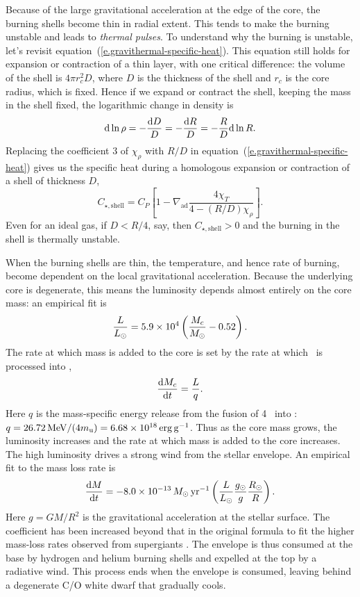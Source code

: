 Because of the large gravitational acceleration at the edge of the core, the burning shells become thin in radial extent.  This tends to make the burning unstable and leads to \emph{thermal pulses}.
To understand why the burning is unstable, let's revisit equation~(\ref{e.gravithermal-specific-heat}).  This equation still holds for expansion or contraction of a thin layer, with one critical difference: the volume of the shell is $4\pi r_{c}^{2}D$, where $D$ is the thickness of the shell and $r_{c}$ is the core radius, which is fixed. Hence if we expand or contract the shell, keeping the mass in the shell fixed, the logarithmic change in density is
\[ \mathrm{d}\ln\rho = -\frac{\mathrm{d} D}{D} = -\frac{\mathrm{d} R}{D} = -\frac{R}{D}\mathrm{d}\ln R. \]
Replacing the coefficient 3 of $\chi_{\rho}$ with $R/D$ in equation~(\ref{e.gravithermal-specific-heat}) gives us the specific heat during a homologous expansion or contraction of a shell of thickness $D$,
\begin{equation}\label{e.thin-shell-specific-heat}
 C_{\star,\mathrm{shell}} = C_{P}\left[1-\nabla_{\mathrm{ad}}\frac{4\chi_{T}}{4-(R/D)\chi_{\rho}}\right].
\end{equation}
Even for an ideal gas, if $D < R/4$, say, then $C_{\star,\mathrm{shell}} > 0$ and the burning in the shell is thermally unstable.

When the burning shells are thin, the temperature, and hence rate of burning, become dependent on the local gravitational acceleration.  Because the underlying core is degenerate, this means the luminosity depends almost entirely on the core mass: an empirical fit is \citep{Paczynski1970Evolution-of-Si}
\begin{equation}\label{e.paczynski}
\frac{L}{L_{\odot}} = 5.9\times 10^{4}\left(\frac{M_{c}}{M_\odot}-0.52\right).
\end{equation}
The rate at which mass is added to the core is set by the rate at which \hydrogen\ is processed into \helium,
\begin{equation}\label{e.mdot-core}
\frac{\mathrm{d} M_{c}}{\mathrm{d} t} = \frac{L}{q}.
\end{equation}
Here $q$ is the mass-specific energy release from the fusion of 4 \hydrogen\ into \helium: $q = 26.72\,\mathrm{M}\mathrm{eV}/(4m_\mathrm{u}) = 6.68\times 10^{18}\,\mathrm{erg}\,{\mathrm{g}}^{-1}$.  Thus as the core mass grows, the luminosity increases and the rate at which mass is added to the core increases.  The high luminosity drives a strong wind from the stellar envelope.  An empirical fit to the mass loss rate is \citep{Reimers1977On-the-absolute}
\begin{equation}\label{e.wind-loss}
\frac{\mathrm{d} M}{\mathrm{d} t} = - 8.0\times 10^{-13}\,M_\odot\,\mathrm{yr}^{-1} \left(\frac{L}{L_{\odot}}\frac{g_{\odot}}{g}\frac{R_{\odot}}{R}\right).
\end{equation}
Here $g = GM/R^{2}$ is the gravitational acceleration at the stellar surface.  The coefficient has been increased beyond that in the original \citet{Reimers1977On-the-absolute} formula to fit the higher mass-loss rates observed from supergiants \citep{Schroder2001The-galactic-ma}.  The envelope is thus consumed at the base by hydrogen and helium burning shells and expelled at the top by a radiative wind. This process ends when the envelope is consumed, leaving behind a degenerate C/O white dwarf that gradually cools.

